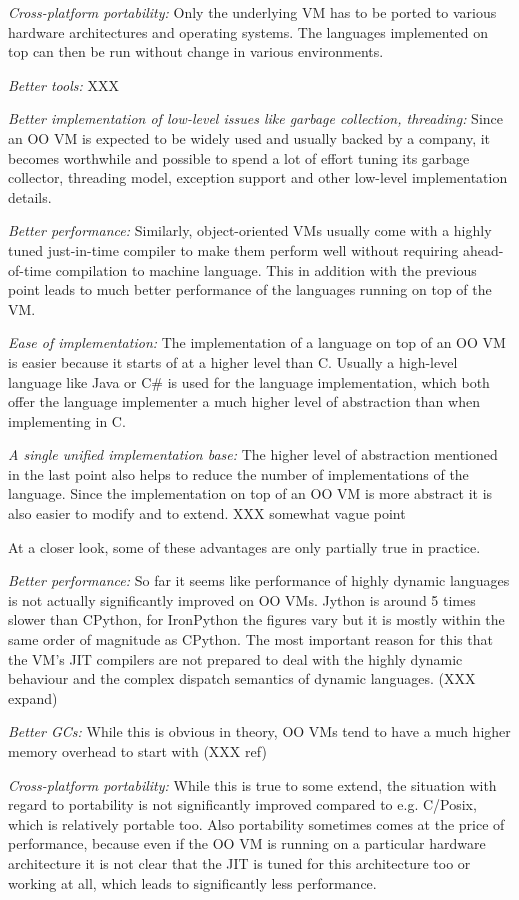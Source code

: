 \documentclass{llncs}
\begin{document}
\emph{Cross-platform portability:} Only the underlying VM has to be ported to
various hardware architectures and operating systems. The languages implemented
on top can then be run without change in various environments.

\emph{Better tools:} XXX

\emph{Better implementation of low-level issues like garbage collection,
threading:} Since an OO VM is expected to be widely used and usually backed by
a company, it becomes worthwhile and possible to spend a lot of effort tuning
its garbage collector, threading model, exception support and other low-level
implementation details.

\emph{Better performance:} Similarly, object-oriented VMs usually come with a
highly tuned just-in-time compiler to make them perform well without requiring
ahead-of-time compilation to machine language. This in addition with the
previous point leads to much better performance of the languages running on top
of the VM.

\emph{Ease of implementation:} The implementation of a language on top of an OO
VM is easier because it starts of at a higher level than C. Usually a
high-level language like Java or C\# is used for the language implementation,
which both offer the language implementer a much higher level of abstraction
than when implementing in C. 

\emph{A single unified implementation base:} The higher level of abstraction
mentioned in the last point also helps to reduce the number of implementations
of the language. Since the implementation on top of an OO VM is more abstract
it is also easier to modify and to extend. XXX somewhat vague point


At a closer look, some of these advantages are only partially true in practice. 

\emph{Better performance:} So far it seems like performance of highly dynamic
languages is not actually significantly improved on OO VMs. Jython is around 5
times slower than CPython, for IronPython the figures vary but it is mostly
within the same order of magnitude as CPython. The most important reason for
this that the VM's JIT compilers are not prepared to deal with the highly
dynamic behaviour and the complex dispatch semantics of dynamic languages. (XXX
expand)

\emph{Better GCs:} While this is obvious in theory, OO VMs tend to have a much
higher memory overhead to start with (XXX ref)

\emph{Cross-platform portability:} While this is true to some extend, the
situation with regard to portability is not significantly improved compared to
e.g.  C/Posix, which is relatively portable too. Also portability sometimes
comes at the price of performance, because even if the OO VM is running on a
particular hardware architecture it is not clear that the JIT is tuned for this
architecture too or working at all, which leads to significantly less
performance.
\end{document}

